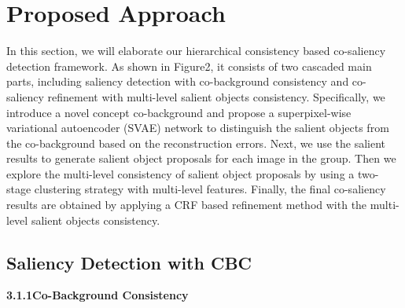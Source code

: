 \documentclass[sigconf]{acmart}
\begin{document}
\section{Proposed Approach}
In this section, we will elaborate our hierarchical consistency based co-saliency detection framework. As shown in Figure2, it consists of two cascaded main parts, including saliency detection with co-background consistency and co-saliency refinement with multi-level salient objects consistency. Specifically, we introduce a novel concept co-background and propose a superpixel-wise variational autoencoder (SVAE) network to distinguish the salient objects from the co-background based on the reconstruction errors. Next, we use the salient results to generate salient object proposals for each image in the group. Then we explore the multi-level consistency of salient object proposals by using a two-stage clustering strategy with multi-level features.  Finally, the final co-saliency results are obtained by applying a CRF based refinement method with the multi-level salient objects consistency.
\subsection{Saliency Detection with CBC}
\vspace{3pt}
\textbf{3.1.1\quad Co-Background Consistency}
\vspace{3pt}
\end{document}
